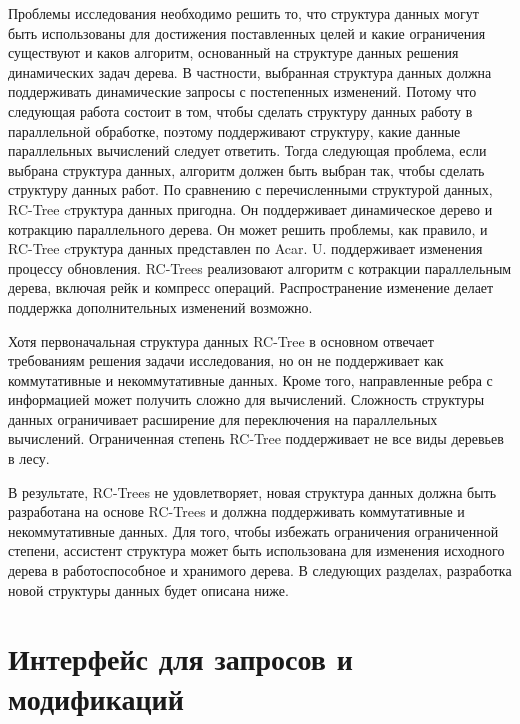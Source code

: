\documentclass[specification,annotation,times]{itmo-student-thesis}
\newcommand{\revise}[1]{{\color{red!70!black} #1 }}
\begin{document}
\revise{
Проблемы исследования необходимо решить то, что структура данных могут быть использованы для достижения поставленных целей и какие ограничения существуют и каков алгоритм, основанный на структуре данных 
решения динамических задач дерева. В частности, выбранная структура данных должна поддерживать динамические запросы с постепенных изменений. Потому что следующая работа состоит в том, чтобы сделать 
структуру данных работу в параллельной обработке, поэтому поддерживают структуру, какие данные параллельных вычислений следует ответить. Тогда следующая проблема, если выбрана структура данных, алгоритм 
должен быть выбран так, чтобы сделать структуру данных работ. По сравнению с перечисленными структурой данных, RC-Tree cтруктура данных пригодна. Он поддерживает динамическое дерево и котракцию 
параллельного дерева. Он может решить проблемы, как правило, и RC-Tree cтруктура данных представлен по Acar. U. поддерживает изменения процессу обновления. RC-Trees реализовают алгоритм с котракции 
параллельным дерева, включая рейк и компресс операций. Распространение изменение делает поддержка дополнительных изменений возможно.
}

\revise{
Хотя первоначальная структура данных RC-Tree в основном отвечает требованиям решения задачи исследования, но он не поддерживает как коммутативные и некоммутативные данных. Кроме того, направленные ребра с 
информацией может получить сложно для вычислений. Сложность структуры данных ограничивает расширение для переключения на параллельных вычислений. Ограниченная степень RC-Tree поддерживает не все виды 
деревьев в лесу.
}

\revise{
В результате, RC-Trees не удовлетворяет, новая структура данных должна быть разработана на основе RC-Trees и должна поддерживать коммутативные и некоммутативные данных. Для того, чтобы избежать 
ограничения ограниченной степени, ассистент структура может быть использована для изменения исходного дерева в работоспособное и хранимого дерева. В следующих разделах, разработка новой структуры данных 
будет описана ниже.
}

\section{Интерфейс для запросов и модификаций}
\end{document}
